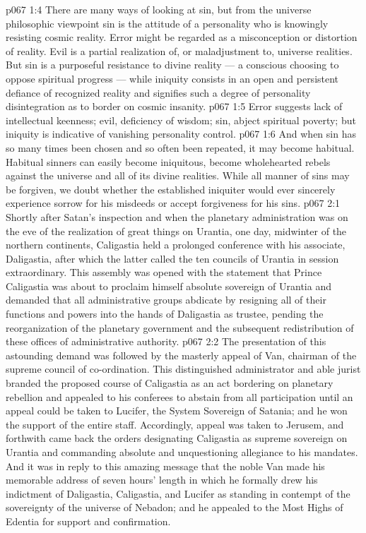 \vs p067 1:4 \pc There are many ways of looking at sin, but from the universe philosophic viewpoint sin is the attitude of a personality who is knowingly resisting cosmic reality. Error might be regarded as a misconception or distortion of reality. Evil is a partial realization of, or maladjustment to, universe realities. But sin is a purposeful resistance to divine reality --- a conscious choosing to oppose spiritual progress --- while iniquity consists in an open and persistent defiance of recognized reality and signifies such a degree of personality disintegration as to border on cosmic insanity.
\vs p067 1:5 Error suggests lack of intellectual keenness; evil, deficiency of wisdom; sin, abject spiritual poverty; but iniquity is indicative of vanishing personality control.
\vs p067 1:6 And when sin has so many times been chosen and so often been repeated, it may become habitual. Habitual sinners can easily become iniquitous, become wholehearted rebels against the universe and all of its divine realities. While all manner of sins may be forgiven, we doubt whether the established iniquiter would ever sincerely experience sorrow for his misdeeds or accept forgiveness for his sins.
\vs p067 2:1 Shortly after Satan’s inspection and when the planetary administration was on the eve of the realization of great things on Urantia, one day, midwinter of the northern continents, Caligastia held a prolonged conference with his associate, Daligastia, after which the latter called the ten councils of Urantia in session extraordinary. This assembly was opened with the statement that Prince Caligastia was about to proclaim himself absolute sovereign of Urantia and demanded that all administrative groups abdicate by resigning all of their functions and powers into the hands of Daligastia as trustee, pending the reorganization of the planetary government and the subsequent redistribution of these offices of administrative authority.
\vs p067 2:2 The presentation of this astounding demand was followed by the masterly appeal of Van, chairman of the supreme council of co\hyp{}ordination. This distinguished administrator and able jurist branded the proposed course of Caligastia as an act bordering on planetary rebellion and appealed to his conferees to abstain from all participation until an appeal could be taken to Lucifer, the System Sovereign of Satania; and he won the support of the entire staff. Accordingly, appeal was taken to Jerusem, and forthwith came back the orders designating Caligastia as supreme sovereign on Urantia and commanding absolute and unquestioning allegiance to his mandates. And it was in reply to this amazing message that the noble Van made his memorable address of seven hours’ length in which he formally drew his indictment of Daligastia, Caligastia, and Lucifer as standing in contempt of the sovereignty of the universe of Nebadon; and he appealed to the Most Highs of Edentia for support and confirmation.
